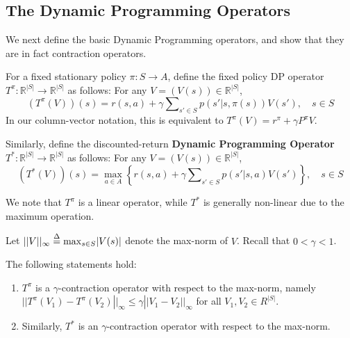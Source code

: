 \subsection{The Dynamic Programming Operators}\label{ss:DP_op}
We next define the basic Dynamic Programming operators, and show that they are in fact contraction operators.

For a fixed stationary policy $\pi :S \to A$, define the fixed policy DP operator $T^\pi:\mathbb R^{|S|} \to \mathbb R^{|S|}$  as follows: For any $V=(V(s))\in \mathbb R^{|S|}$,
\[(T_{}^\pi (V))(s) = r(s,a) + \gamma \sum\nolimits_{s' \in S} {p(s'|s,\pi (s))V(s')} ,\quad s \in S\]
In our column-vector notation, this is equivalent to  $T_{}^\pi (V) = {r^\pi } + \gamma {P^\pi }V$.

Similarly, define the discounted-return \textbf{Dynamic Programming Operator}  $T^*:\mathbb R^{|S|} \to \mathbb R^{|S|}$ as follows: For any $V=(V(s))\in \mathbb R^{|S|}$,
\[(T_{}^*(V))(s) = \mathop {\max }\limits_{a \in A} \left\{ {r(s,a) + \gamma \sum\nolimits_{s' \in S} {p(s'|s,a)V(s')} } \right\},\quad s \in S\]

We note that $T_{}^\pi $ is a linear operator, while $T_{}^*$ is generally non-linear due to the maximum operation.

Let $||V|{|_\infty } \buildrel \Delta \over = {\max _{s \in S}}|V(s)|$ denote the max-norm of $V$.  Recall that $0 < \gamma  < 1$.

\begin{theorem}\label{thm:_CONTRACT} The following statements hold:
\begin{enumerate}
  \item $T_{}^\pi $ is a $\gamma$-contraction operator with respect to the max-norm,  namely
                      $||T_{}^\pi ({V_1}) - T_{}^\pi ({V_2})|{|_\infty } \le \gamma ||{V_1} - {V_2}|{|_\infty }$ for all $V_1,V_2\in R^{|S|}$.
  \item Similarly, $T_{}^*$ is an $\gamma$-contraction operator with respect to the max-norm.
\end{enumerate}
\end{theorem}

